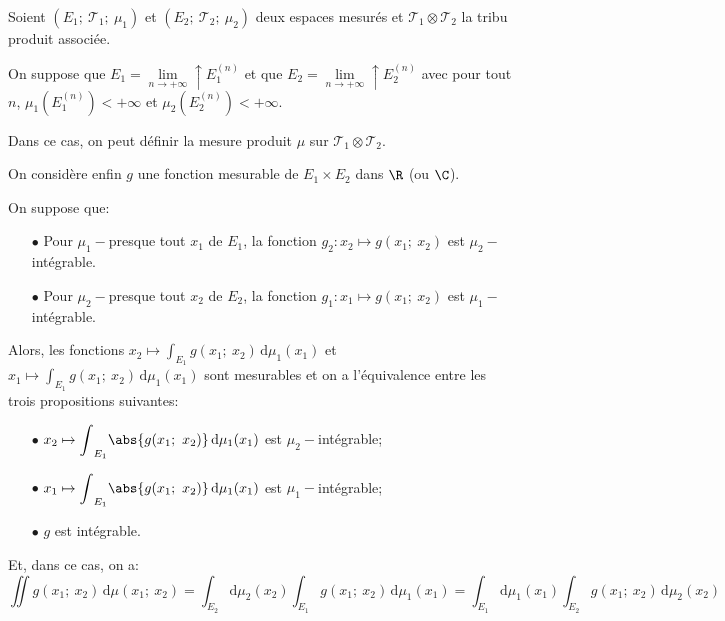 \begin{theo}
Soient $(E_1;~\mathcal{T}_1;~\mu_1)$ et $(E_2;~\mathcal{T}_2;~\mu_2)$ deux espaces mesurés et $\mathcal{T}_1 \otimes \mathcal{T}_2$ la tribu produit associée.

On suppose que $E_1 = \lim \limits_{n \to +\infty} \uparrow E_1^{(n)}$ et que $E_2 = \lim \limits_{n \to +\infty} \uparrow E_2^{(n)}$ avec pour tout $n$, $\mu_1\left(E_1^{(n)}\right)<+\infty$ et $\mu_2\left(E_2^{(n)}\right)<+\infty$.

Dans ce cas, on peut définir la mesure produit $\mu$ sur $\mathcal{T}_1 \otimes \mathcal{T}_2$.

On considère enfin $g$ une fonction mesurable de $E_1 \times E_2$ dans $\R$ (ou $\C$).

On suppose que:
\begin{itemize}
\item[$\bullet$] Pour $\mu_1-$presque tout $x_1$ de $E_1$, la fonction  $g_2: x_2 \mapsto g(x_1;~x_2)$ est $\mu_2-$intégrable.
\item[$\bullet$] Pour $\mu_2-$presque tout $x_2$ de $E_2$, la fonction  $g_1: x_1 \mapsto g(x_1;~x_2)$ est $\mu_1-$intégrable.
\end{itemize}

Alors, les fonctions $x_2 \mapsto \displaystyle{\int}_{E_1} g(x_1;~x_2) \, \mathrm d \mu_1(x_1)$ et $x_1 \mapsto \displaystyle{\int}_{E_1} g(x_1;~x_2) \, \mathrm d \mu_1(x_1)$ sont mesurables et on a l'équivalence entre les trois propositions suivantes:
\begin{itemize}
\item[$\bullet$] $x_2 \mapsto \displaystyle{\int}_{E_1} \abs{g(x_1;~x_2)} \, \mathrm d \mu_1(x_1)$ est $\mu_2-$intégrable;
\item[$\bullet$] $x_1 \mapsto \displaystyle{\int}_{E_1} \abs{g(x_1;~x_2)} \, \mathrm d \mu_1(x_1)$ est $\mu_1-$intégrable;
\item[$\bullet$] $g$ est intégrable.
\end{itemize}

Et, dans ce cas, on a:
\[
\displaystyle{\iint} g(x_1;~x_2) \, \mathrm d \mu(x_1;~x_2) = \displaystyle{\int}_{E_2} \mathrm d \mu_2(x_2) \displaystyle{\int}_{E_1} g(x_1;~x_2) \, \mathrm d \mu_1(x_1) = \displaystyle{\int}_{E_1} \mathrm d \mu_1(x_1) \displaystyle{\int}_{E_2} g(x_1;~x_2) \, \mathrm d \mu_2(x_2)
\]
\end{theo}

